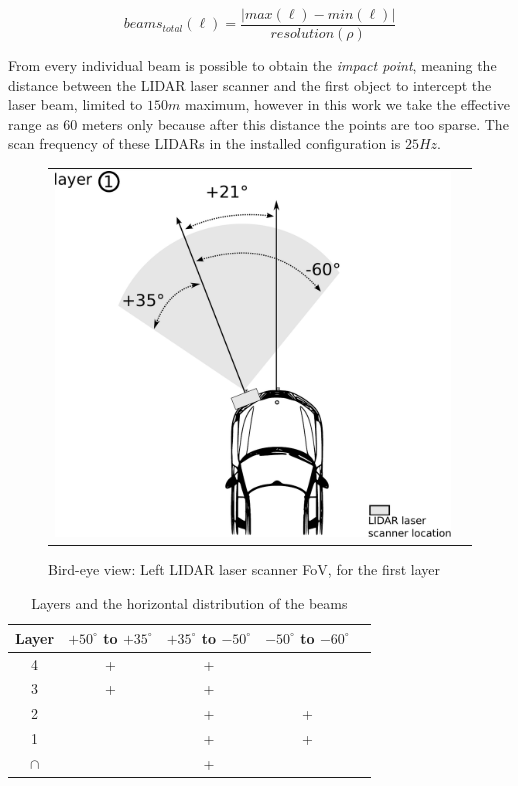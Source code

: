 \begin{equation}
\label{eq:totalbeams}
beams_{total}(\ell)=\frac{|max(\ell)-min(\ell)|}{resolution(\rho)}
\end{equation}

From every individual beam is possible to obtain the \textit{impact point}, meaning the distance between the LIDAR laser scanner and the first object to intercept the laser beam, limited to $150m$ maximum, however in this work we take the effective range as 60 meters only because after this distance the points are too sparse. The scan frequency of these LIDARs in the installed configuration is $25Hz$.

\begin{figure}[h]
   \centering
     \begin{tabular}{lr}
       \includegraphics[scale=0.5]{img/fig:demonstrator:superior}
     \end{tabular}
   \caption{Bird-eye view: Left LIDAR laser scanner FoV, for the first layer}
   \label{fig:demonstrator:superior}
\end{figure}


\begin{table}
	\begin{center}
	    \begin{tabular}{ | c | c | c | c | c |}
		    \hline
		    Layer & $+50^\circ$ to $+35^\circ$ & $+35^\circ$ to $-50^\circ$ & $-50^\circ$ to $-60^\circ$ \\ \hline
		    4 & + & + &    \\ \hline
		    3 & + & + &    \\ \hline
		    2 &  & + & + \\ \hline
		    1 &  & + & + \\ \hline
		    $\cap$ &  & + &   \\ \hline
	    \end{tabular}
	\end{center}
    \caption{Layers and the horizontal distribution of the beams}
\label{tab:beam:interception}
\end{table}

